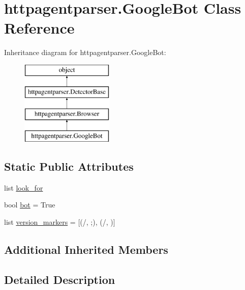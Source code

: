 \hypertarget{classhttpagentparser_1_1_google_bot}{}\section{httpagentparser.\+Google\+Bot Class Reference}
\label{classhttpagentparser_1_1_google_bot}
Inheritance diagram for httpagentparser.\+Google\+Bot\+:\begin{figure}[H]
\begin{center}
\leavevmode
\includegraphics[height=4.000000cm]{classhttpagentparser_1_1_google_bot}
\end{center}
\end{figure}
\subsection*{Static Public Attributes}
\begin{DoxyCompactItemize}
\item 
list \hyperlink{classhttpagentparser_1_1_google_bot_a636bf433b35b63c3e2ffad370cadbc25}{look\+\_\+for}
\item 
bool \hyperlink{classhttpagentparser_1_1_google_bot_a2dd2130d9ff8a3ada4242343a8d9f46f}{bot} = True
\item 
list \hyperlink{classhttpagentparser_1_1_google_bot_ad164588f023484c9c15320a36027ebcb}{version\+\_\+markers} = \mbox{[}(\textquotesingle{}/\textquotesingle{}, \textquotesingle{};\textquotesingle{}), (\textquotesingle{}/\textquotesingle{}, \textquotesingle{} \textquotesingle{})\mbox{]}
\end{DoxyCompactItemize}
\subsection*{Additional Inherited Members}


\subsection{Detailed Description}


